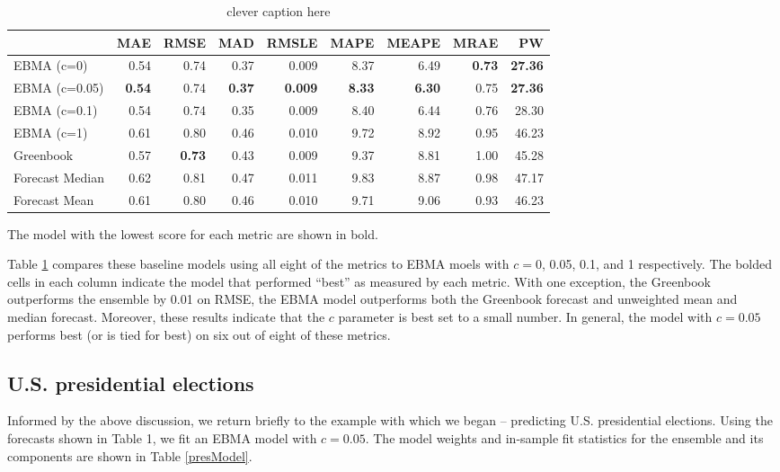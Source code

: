 \documentclass[12pt,fullpage,endnotes]{article}
\begin{document}
\begin{table}[h]
\caption{clever caption here}
\begin{center}
\begin{tabular}{lrrrrrrrr}
\toprule
 & MAE & RMSE & MAD & RMSLE & MAPE & MEAPE & MRAE & PW \\ 
\midrule
 EBMA (c=0)& 0.54 & 0.74 & 0.37 & 0.009 & 8.37 & 6.49 & \textbf{0.73} & \textbf{27.36} \\ 
  EBMA (c=0.05)& \textbf{0.54} & 0.74 &\textbf{ 0.37} & \textbf{0.009} & \textbf{8.33} & \textbf{6.30} & 0.75 & \textbf{27.36} \\ 
 EBMA (c=0.1)& 0.54 & 0.74 & 0.35 & 0.009 & 8.40 & 6.44 & 0.76 & 28.30 \\ 
EBMA (c=1) & 0.61 & 0.80 & 0.46 & 0.010 & 9.72 & 8.92 & 0.95 & 46.23 \\ 
 Greenbook& 0.57 & \textbf{0.73} & 0.43 & 0.009 & 9.37 & 8.81 & 1.00 & 45.28 \\ 
 Forecast Median& 0.62 & 0.81 & 0.47 & 0.011 & 9.83 & 8.87 & 0.98 & 47.17 \\ 
Forecast Mean& 0.61 & 0.80 & 0.46 & 0.010 & 9.71 & 9.06 & 0.93 & 46.23 \\ 
\bottomrule
\end{tabular}
\end{center}

\label{compareTable1}
The model with the lowest score for each metric are shown in bold.  
\end{table}


Table \ref{compareTable1} compares these baseline models using all
eight of the metrics to EBMA moels with $c=$0, 0.05, 0.1, and 1
respectively.  The bolded cells in each column indicate the model that
performed ``best'' as measured by each metric.  With one exception,
the Greenbook outperforms the ensemble by 0.01 on RMSE, the EBMA model
outperforms both the Greenbook forecast and unweighted mean and
median forecast.  Moreover, these results indicate that the $c$
parameter is best set to a small number.  In general, the model with
$c=0.05$ performs best (or is tied for best) on six out of eight of
these metrics.


\subsection{U.S. presidential elections}

Informed by the above discussion, we return briefly to the example
with which we began -- predicting U.S. presidential elections.  Using
the forecasts shown in Table 1, we fit an EBMA model with $c=0.05$.
The model weights and in-sample fit statistics for the ensemble and
its components are shown in Table \ref{presModel}.
\end{document}
